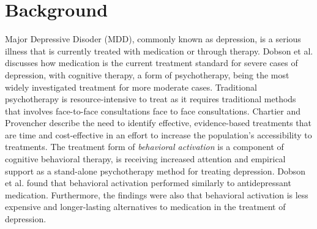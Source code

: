 \section{Background}


Major Depressive Disoder (MDD), commonly known as depression, is a serious illness that is currently treated with medication or through therapy. Dobson et al. \cite{randomized_trial_behavioural_activation} discusses how medication is the current treatment standard for severe cases of depression, with cognitive therapy, a form of psychotherapy, being the most widely investigated treatment for more moderate cases. Traditional psychotherapy is resource-intensive to treat as it requires traditional methods that involves face-to-face consultations face to face consultations. Chartier and Provencher \cite{behavioural_activation_for_depression} describe the need to identify effective, evidence-based treatments that are time and cost-effective in an effort to increase the population's accessibility to treatments. The treatment form of \textit{behavioral activation} is a component of cognitive behavioral therapy, is receiving increased attention and empirical support as a stand-alone psychotherapy method for treating depression. Dobson et al. found that behavioral activation performed similarly to antidepressant medication. Furthermore, the findings were also that behavioral activation is less expensive and longer-lasting alternatives to medication in the treatment of depression.  \\

